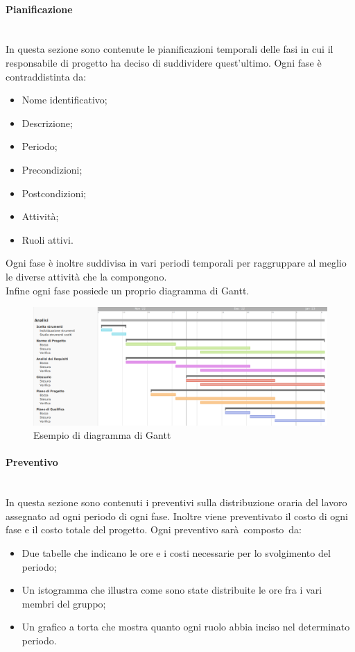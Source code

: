 \paragraph {Pianificazione}\mbox{}\\
In questa sezione sono contenute le pianificazioni temporali delle fasi in cui il responsabile di progetto ha deciso di suddividere quest'ultimo.
Ogni fase è contraddistinta da:
\begin{itemize}
	\item Nome identificativo;
	\item Descrizione;
	\item Periodo;
	\item Precondizioni;
	\item Postcondizioni;
	\item Attività;
	\item Ruoli attivi.
\end{itemize}
Ogni fase è inoltre suddivisa in vari periodi temporali per raggruppare al meglio le diverse attività che la compongono.\\
Infine ogni fase possiede un proprio diagramma di Gantt.
\begin{figure}[h!]
	\centering
	\includegraphics[width=15cm]{img/4_analisi.png}
	\caption{Esempio di diagramma di Gantt}
\end{figure}
\paragraph {Preventivo}\mbox{}\\
In questa sezione sono contenuti i preventivi sulla distribuzione oraria del lavoro assegnato ad ogni periodo di ogni fase. Inoltre viene preventivato il costo di ogni fase e il costo totale del progetto. Ogni preventivo sarà composto da:
\begin{itemize}
	\item Due tabelle che indicano le ore e i costi necessarie per lo svolgimento del periodo;
	\item Un istogramma che illustra come sono state distribuite le ore fra i vari membri del gruppo;
	\item Un grafico a torta che mostra quanto ogni ruolo abbia inciso nel determinato periodo.
\end{itemize}

